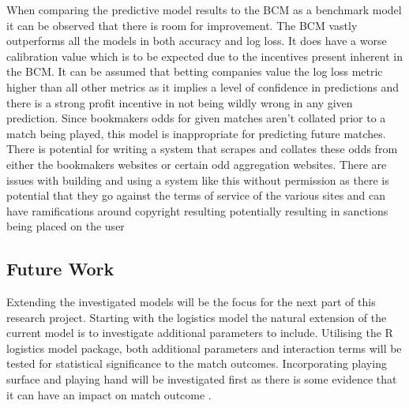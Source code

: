 \documentclass[12pt,a4paper]{article}
\begin{document}
When comparing the predictive model results to the BCM as a benchmark model
it can be observed that there is room for improvement. The BCM vastly
outperforms all the models in both accuracy and log loss. It does have a worse calibration
value which is to be expected due to the incentives present inherent in the BCM. It can be assumed
that betting companies value the log loss metric higher than all other metrics as it implies a level
of confidence in predictions and there is a strong profit incentive in not being wildly wrong
in any given prediction. Since bookmakers odds for given matches aren't collated prior to a match
being played, this model is inappropriate for predicting future matches. There is potential for
writing a system that scrapes and collates these odds from either the bookmakers websites or
certain odd aggregation websites. There are issues with building and using a system like
this without permission as there is potential that they go against the terms of service of the
various sites and can have ramifications around copyright resulting potentially resulting in
sanctions being placed on the user \cite{out-lawcom_ryanair_nodate}

\subsection{Future Work}
Extending the investigated models will be the focus for the next part of this research
project. Starting with the logistics model the natural extension of the current model
is to investigate additional parameters to include. Utilising the R logistics model
package, both additional parameters and interaction terms will be tested for statistical
significance to the match outcomes. Incorporating playing surface and playing hand will
be investigated first as there is some evidence that it can have an impact on match
outcome \cite{loffing_left-handedness_2012}.
\end{document}
